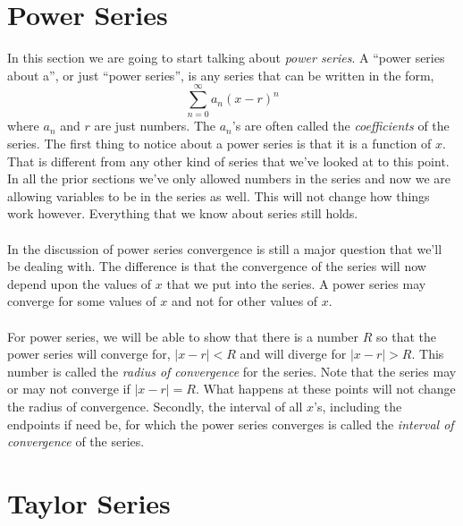 \documentclass[10pt,reqno]{book}
\theoremstyle{definition}
\begin{document}
	
	\section{Power Series}
	
	In this section we are going to start talking about \textit{power series}. A ``power series about a'', or just ``power series'', is any series that can be written in the form,
	\[ \sum\limits_{n=0}^{\infty} a_n (x-r)^n \]
	where $ a_n $ and $ r $ are just numbers. The $ a_n $'s are often called the \textit{coefficients} of the series. The first thing to notice about a power series is that it is a function of $ x $. That is different from any other kind of series that we've looked at to this point. In all the prior sections we've only allowed numbers in the series and now we are allowing variables to be in the series as well. This will not change how things work however. Everything that we know about series still holds.\\ \\
	In the discussion of power series convergence is still a major question that we'll be dealing with. The difference is that the convergence of the series will now depend upon the values of $ x $ that we put into the series. A power series may converge for some values of $ x $ and not for other values of $ x $.\\ \\
	For power series, we will be able to show that there is a number $ R $ so that the power series will converge for, $ |x-r| < R $ and will diverge for $ |x-r| > R $. This number is called the \textit{radius of convergence} for the series. Note that the series may or may not converge if $ |x-r| = R $. What happens at these points will not change the radius of convergence. Secondly, the interval of all $ x $'s, including the endpoints if need be, for which the power series converges is called the \textit{interval of convergence} of the series.
	
	\section{Taylor Series}
	
\end{document}
